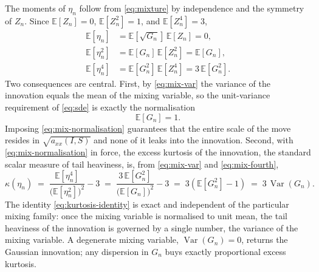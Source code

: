 \documentclass[11pt]{article}
\theoremstyle{plain}
\theoremstyle{definition}
\newcommand{\E}{\mathbb{E}}
\newcommand{\Var}{\operatorname{Var}}
\newcommand{\axx}{a_{xx}}
\begin{document}
The moments of $\eta_n$ follow from \eqref{eq:mixture} by independence and the
symmetry of $Z_n$. Since $\E[Z_n]=0$, $\E[Z_n^2]=1$, and $\E[Z_n^4]=3$,
\begin{align}
  \E[\eta_n] &= \E[\sqrt{G_n}]\,\E[Z_n] = 0, \label{eq:mix-mean}\\
  \E[\eta_n^2] &= \E[G_n]\,\E[Z_n^2] = \E[G_n], \label{eq:mix-var}\\
  \E[\eta_n^4] &= \E[G_n^2]\,\E[Z_n^4] = 3\,\E[G_n^2]. \label{eq:mix-fourth}
\end{align}
Two consequences are central. First, by \eqref{eq:mix-var} the variance of the
innovation equals the mean of the mixing variable, so the unit-variance requirement
of \eqref{eq:sde} is exactly the normalisation
\begin{equation}
  \E[G_n]=1.
  \label{eq:mix-normalisation}
\end{equation}
Imposing \eqref{eq:mix-normalisation} guarantees that the entire scale of the move
resides in $\sqrt{\axx(I,S)}$ and none of it leaks into the innovation. Second, with
\eqref{eq:mix-normalisation} in force, the excess kurtosis of the innovation, the
standard scalar measure of tail heaviness, is, from \eqref{eq:mix-var} and
\eqref{eq:mix-fourth},
\begin{equation}
  \kappa(\eta_n)
  \;=\; \frac{\E[\eta_n^4]}{\bigl(\E[\eta_n^2]\bigr)^2} - 3
  \;=\; \frac{3\,\E[G_n^2]}{\bigl(\E[G_n]\bigr)^2} - 3
  \;=\; 3\left(\E[G_n^2]-1\right)
  \;=\; 3\,\Var(G_n).
  \label{eq:kurtosis-identity}
\end{equation}
The identity \eqref{eq:kurtosis-identity} is exact and independent of the particular
mixing family: once the mixing variable is normalised to unit mean, the tail
heaviness of the innovation is governed by a single number, the variance of the
mixing variable. A degenerate mixing variable, $\Var(G_n)=0$, returns the Gaussian
innovation; any dispersion in $G_n$ buys exactly proportional excess kurtosis.
\end{document}
